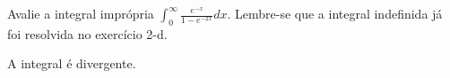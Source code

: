 \begin{exercises*}
\begin{exercise}
Avalie a integral imprópria \(\int_0^{\infty} \frac{e^{-x}}{1-e^{-2x}}dx\).
Lembre-se que a integral indefinida já foi resolvida no exercício 2-d.
\begin{answer}
  A integral é divergente.
\end{answer}
\end{exercise}




\end{exercises*}
